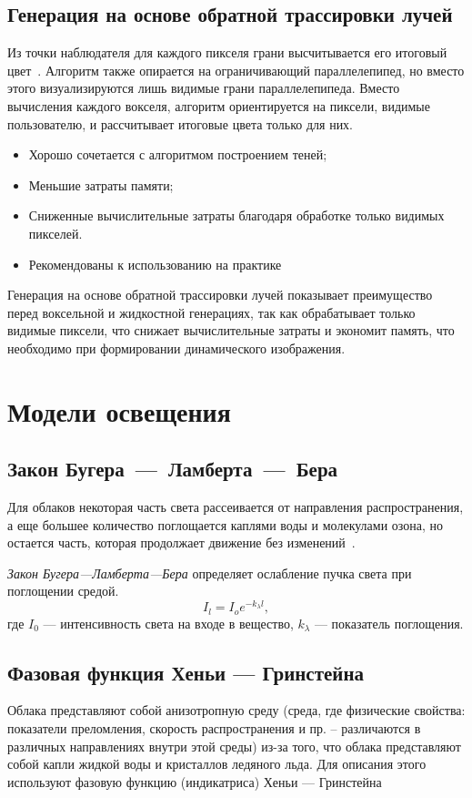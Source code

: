 \subsection{Генерация на основе обратной трассировки лучей}
Из точки наблюдателя для каждого пикселя грани высчитывается его итоговый цвет~\cite{Patapom2013, sym10040125}.
Алгоритм также опирается на ограничивающий параллелепипед, но вместо этого визуализируются лишь видимые грани параллелепипеда. Вместо вычисления каждого вокселя, алгоритм ориентируется на пиксели, видимые пользователю, и рассчитывает итоговые цвета только для них. 
\begin{itemize} 
	\item Хорошо сочетается с алгоритмом построением теней;
	\item Меньшие затраты памяти; 
	\item Сниженные вычислительные затраты благодаря обработке только видимых пикселей.
	\item Рекомендованы к использованию на практике~\cite{guerrilla_volumetric_cloudscapes_2023, sym10040125, windahl_real_time_2018}
\end{itemize}
Генерация на основе обратной трассировки лучей показывает преимущество перед воксельной и жидкостной генерациях, так как обрабатывает только видимые пиксели, что снижает вычислительные затраты и экономит память, что необходимо при формировании динамического изображения.

\section{Модели освещения}
\subsection{Закон Бугера~---~Ламберта~---~Бера}
Для облаков некоторая часть света рассеивается от направления распространения, а еще большее количество поглощается каплями воды и молекулами озона, но остается часть, которая продолжает движение без изменений~\cite{guerrilla_volumetric_cloudscapes_2023, sym10040125}.

\textit{Закон Бугера---Ламберта---Бера} определяет ослабление пучка света при поглощении средой.
\begin{equation}
	\label{eq:beers-law}
	I_l=I_{o}e^{-k_{\lambda }l},
\end{equation} где 
{$I_{0}$} — интенсивность света на входе в вещество, 
$k_\lambda$ — показатель поглощения.
\subsection{Фазовая функция Хеньи — Гринстейна}
Облака представляют собой анизотропную среду (среда, где физические свойства: показатели преломления, скорость распространения и пр. -- различаются в различных направлениях внутри этой среды) из-за того, что облака представляют собой капли жидкой воды и кристаллов ледяного льда. Для описания этого используют фазовую функцию (индикатриса) Хеньи — Гринстейна~\cite{guerrilla_volumetric_cloudscapes_2023, sym10040125}

